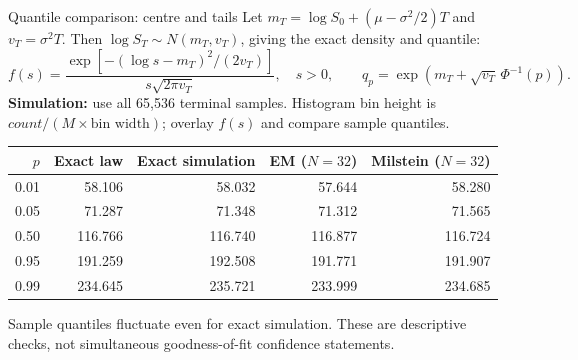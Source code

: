 \documentclass[aspectratio=169,11pt]{beamer}
\begin{document}
\begin{frame}{Quantile comparison: centre and tails}
\small
Let $m_T=\log S_0+(\mu-\sigma^2/2)T$ and $v_T=\sigma^2T$.
Then $\log S_T\sim N(m_T,v_T)$, giving the exact density and quantile:
\[
 f(s)=\frac{\exp[-(\log s-m_T)^2/(2v_T)]}{s\sqrt{2\pi v_T}},\quad s>0,
 \qquad q_p=\exp\!\left(m_T+\sqrt{v_T}\,\Phi^{-1}(p)\right).
\]
\textbf{Simulation:} use all 65,536 terminal samples. Histogram bin height is
$count/(M\times\text{bin width})$; overlay $f(s)$ and compare sample quantiles.
\medskip

\centering
\begin{tabular}{rrrrr}
\toprule
$p$ & Exact law & Exact simulation & EM ($N=32$) & Milstein ($N=32$)\\
\midrule
0.01 & 58.106 & 58.032 & 57.644 & 58.280\\
0.05 & 71.287 & 71.348 & 71.312 & 71.565\\
0.50 & 116.766 & 116.740 & 116.877 & 116.724\\
0.95 & 191.259 & 192.508 & 191.771 & 191.907\\
0.99 & 234.645 & 235.721 & 233.999 & 234.685\\
\bottomrule
\end{tabular}
\par\medskip
\raggedright
Sample quantiles fluctuate even for exact simulation. These are descriptive
checks, not simultaneous goodness-of-fit confidence statements.
\end{frame}
\end{document}
